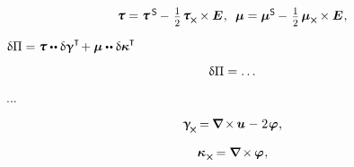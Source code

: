 \begin{equation*}
\begin{array}{c}
%
\forcestresstensor = \forcestresstensor^{\hspace{.32ex}\mathsf{S}} \hspace{-0.1ex} - \hspace{.25ex} \smalldisplaystyleonehalf \hspace{.2ex} \forcestresstensor_{\hspace{-0.1ex}\Xcompanion} \hspace{-0.1ex} \times \UnitDyad
\hspace{.1ex} ,
\;\:
%
\couplestresstensor = \couplestresstensor^{\mathsf{S}} \hspace{-0.1ex} - \hspace{.25ex} \smalldisplaystyleonehalf \hspace{.32ex} \couplestresstensor_{\Xcompanion} \hspace{-0.1ex} \times \UnitDyad
\hspace{.1ex} ,
\end{array}
\end{equation*}

\noindent
{}
${\variation{\potentialenergydensity} = \forcestresstensor \dotdotp \variation{\distortiontensor}^{\T} \hspace{-0.3ex}
+ \couplestresstensor \dotdotp \variation{\wrynesstensor}^{\T} \hspace{-0.25ex}}$

\nopagebreak\vspace{-0.1em}\begin{equation}
\updelta\hspace{-0.1ex}\Pi = \ldots
\end{equation}

...

\begin{equation*}
\distortiontensor_{\hspace{-0.25ex}\Xcompanion} \hspace{-0.16ex}
= \hspace{-0.1ex} \boldnabla \hspace{-0.16ex} \times \hspace{-0.1ex} \fieldofdisplacements \hspace{.12ex} - \hspace{.12ex} 2 \hspace{.16ex} \fieldofrotations
\hspace{.1ex} ,
\end{equation*}

\begin{equation*}
\wrynesstensor_{\hspace{.15ex}\Xcompanion} \hspace{-0.16ex}
= \boldnabla \hspace{-0.16ex} \times \hspace{-0.1ex} \fieldofrotations
\hspace{.1ex} ,
\end{equation*}

